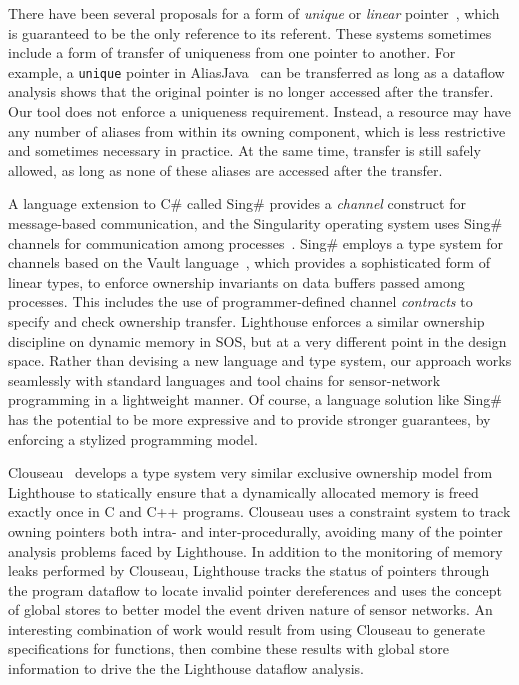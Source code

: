 There have been several proposals for a form of {\em unique} or {\em linear}
pointer~\cite{Boyland:2001:ABU,aliasjava,Wad90:linear}, which is guaranteed
to be the only reference to its referent.  
%
These systems sometimes include a form of transfer of uniqueness from one
pointer to another.
%
For example, a {\tt unique} pointer in AliasJava~\cite{aliasjava} can be
transferred as long as a dataflow analysis shows that the original pointer
is no longer accessed after the transfer.  
%
Our tool does not enforce a uniqueness requirement.
%
Instead, a resource may have any number of aliases from within its owning
component, which is less restrictive and sometimes necessary in practice.
%
%  
At the same time, transfer is still safely allowed, as long as none of these
aliases are accessed after the transfer.



A language extension to C\# called Sing\# provides a {\em channel} construct
for message-based communication, and the Singularity operating system uses
Sing\# channels for communication among
processes~\cite{fahndrich06language}.  
%
Sing\# employs a type system for channels based on the Vault
language~\cite{Vault,adoption-focus}, which provides a sophisticated form of
linear types, to enforce ownership invariants on data buffers passed among
processes.  
%
This includes the use of programmer-defined channel {\em contracts} to
specify and check ownership transfer.
%
Lighthouse enforces a similar ownership discipline on dynamic memory in SOS,
but at a very different point in the design space.  
%
Rather than devising a new language and type system, our approach works
seamlessly with standard languages and tool chains for sensor-network
programming in a lightweight manner.  
%
Of course, a language solution like Sing\# has the potential to be more
expressive and to provide stronger guarantees, by enforcing a stylized
programming model.



%
Clouseau~\cite{heine03pldi} develops a type system very similar exclusive
ownership model from Lighthouse to statically ensure that a dynamically
allocated memory is freed exactly once in C and C++ programs.
%
Clouseau uses a constraint system to track owning pointers both intra- and
inter-procedurally, avoiding many of the pointer analysis problems faced by
Lighthouse.
%
In addition to the monitoring of memory leaks performed by Clouseau,
Lighthouse tracks the status of pointers through the program dataflow to
locate invalid pointer dereferences and uses the concept of global stores to
better model the event driven nature of sensor networks.
%
An interesting combination of work would result from using Clouseau to
generate specifications for functions, then combine these results with
global store information to drive the the Lighthouse dataflow analysis.



